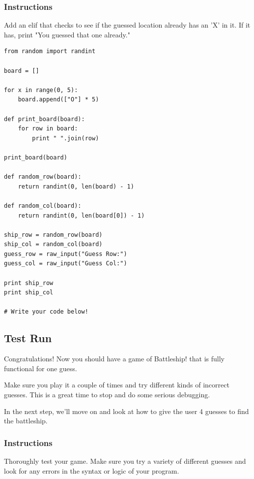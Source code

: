 \documentclass[12pt,a4paper,final,twoside,onecolumn,titlepage]{book}
\begin{document}
\subsubsection{Instructions}

Add an elif that checks to see if the guessed location already has an 'X' in it. If it has, print "You guessed that one already."

\begin{lstlisting}
from random import randint

board = []

for x in range(0, 5):
    board.append(["O"] * 5)

def print_board(board):
    for row in board:
        print " ".join(row)

print_board(board)

def random_row(board):
    return randint(0, len(board) - 1)

def random_col(board):
    return randint(0, len(board[0]) - 1)

ship_row = random_row(board)
ship_col = random_col(board)
guess_row = raw_input("Guess Row:")
guess_col = raw_input("Guess Col:")

print ship_row
print ship_col

# Write your code below!

\end{lstlisting}

\subsection{Test Run}

Congratulations! Now you should have a game of Battleship! that is fully functional for one guess.

Make sure you play it a couple of times and try different kinds of incorrect guesses. This is a great time to stop and do some serious debugging.

In the next step, we'll move on and look at how to give the user 4 guesses to find the battleship.
\subsubsection{Instructions}

Thoroughly test your game. Make sure you try a variety of different guesses and look for any errors in the syntax or logic of your program.
\end{document}
